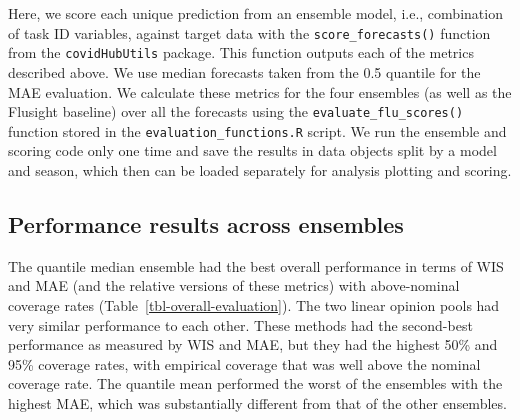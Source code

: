 \documentclass[
]{article}
\begin{document}
Here, we score each unique prediction from an ensemble model, i.e.,
combination of task ID variables, against target data with the
\texttt{score\_forecasts()} function from the \texttt{covidHubUtils}
package. This function outputs each of the metrics described above. We
use median forecasts taken from the 0.5 quantile for the MAE evaluation.
We calculate these metrics for the four ensembles (as well as the
Flusight baseline) over all the forecasts using the
\texttt{evaluate\_flu\_scores()} function stored in the
\texttt{evaluation\_functions.R} script. We run the ensemble and scoring
code only one time and save the results in data objects split by a model
and season, which then can be loaded separately for analysis plotting
and scoring.

\subsection{Performance results across
ensembles}\label{performance-results-across-ensembles}

The quantile median ensemble had the best overall performance in terms
of WIS and MAE (and the relative versions of these metrics) with
above-nominal coverage rates (Table~\ref{tbl-overall-evaluation}). The
two linear opinion pools had very similar performance to each other.
These methods had the second-best performance as measured by WIS and
MAE, but they had the highest 50\% and 95\% coverage rates, with
empirical coverage that was well above the nominal coverage rate. The
quantile mean performed the worst of the ensembles with the highest MAE,
which was substantially different from that of the other ensembles.
\end{document}
